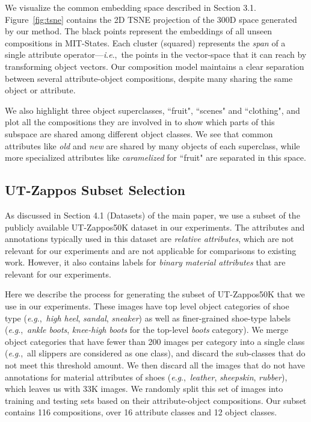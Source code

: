 \documentclass[runningheads]{llncs}
\newcommand{\ie}{\textit{i}.\textit{e}.,~}
\newcommand{\eg}{\textit{e}.\textit{g}.,~}
\newcommand{\reffig}[1]{Figure~\ref{#1}}
\begin{document}
We visualize the common embedding space described in Section 3.1. \reffig{fig:tsne} contains the 2D TSNE projection of the 300D space generated by our method. The black points represent the embeddings of all unseen compositions in MIT-States. Each cluster (squared) represents the \emph{span} of a single attribute operator---\ie the points in the vector-space that it can reach by transforming object vectors. Our composition model maintains a clear separation between several attribute-object compositions, despite many sharing the same object or attribute. 

We also highlight three object superclasses, ``fruit", ``scenes" and ``clothing", and plot all the compositions they are involved in to show which parts of this subspace are shared among different object classes. We see that common attributes like \emph{old} and \emph{new} are shared by many objects of each superclass, while more specialized attributes like \emph{caramelized} for ``fruit" are separated in this space.


\subsection*{UT-Zappos Subset Selection}

As discussed in Section 4.1 (Datasets) of the main paper, we use a subset of the publicly available UT-Zappos50K dataset in our experiments.  The attributes and annotations typically used in this dataset are \emph{relative attributes}, which are not relevant for our experiments and are not applicable for comparisons to existing work.  However, it also contains labels for \emph{binary material attributes} that are relevant for our experiments.

Here we describe the process for generating the subset of UT-Zappos50K  that we use in our experiments. These images have top level object categories of shoe type (\eg \emph{high heel}, \emph{sandal}, \emph{sneaker}) as well as  finer-grained shoe-type labels (\eg \emph{ankle boots}, \emph{knee-high boots} for the top-level \emph{boots} category). We merge object categories that have fewer than 200 images per category into a single class (\eg all slippers are considered as one class), and discard the sub-classes that do not meet this threshold amount. We then discard all the images that do not have annotations for material attributes of shoes (\eg \emph{leather}, \emph{sheepskin}, \emph{rubber}), which leaves us with 33K images. We randomly split this set of images into training and testing sets based on their attribute-object compositions. Our subset contains 116 compositions, over 16 attribute classes and 12 object classes.
\end{document}
